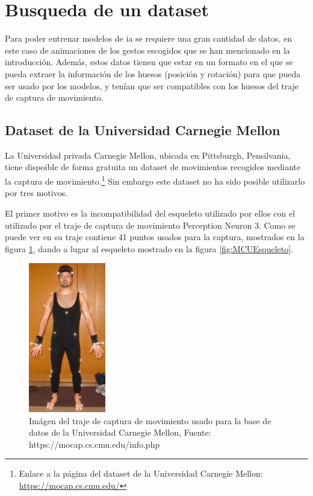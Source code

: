 \section{Busqueda de un dataset}
\label{sec:busquedaDataset}
Para poder entrenar modelos de \gls{ia} se requiere una gran cantidad de datos, en este caso de animaciones de los gestos escogidos que se han mencionado en la introducción.
Además, estos datos tienen que estar en un formato en el que se pueda extraer la información de los huesos (posición y rotación) para que pueda ser usado por los modelos, y tenían que ser compatibles con los huesos del traje de captura de movimiento.

\subsection{Dataset de la Universidad Carnegie Mellon}
La Universidad privada Carnegie Mellon, ubicada en Pittsburgh, Pensilvania, tiene dispoible de forma gratuita un dataset de movimientos recogidos mediante la captura de movimiento.\footnote{Enlace a la página del dataset de la Universidad Carnegie Mellon: \url{https://mocap.cs.cmu.edu/}}
Sin embargo este dataset no ha sido posible utilizarlo por tres motivos.

El primer motivo es la incompatibilidad del esqueleto utilizado por ellos con el utilizado por el traje de captura de movimiento Perception Neuron 3.
Como se puede ver en \cite{MCUINFO} su traje contiene 41 puntos usados para la captura, mostrados en la figura \ref{fig:MCUTraje}, dando a lugar al esqueleto mostrado en la figura \ref{fig:MCUEsqueleto}.

\begin{figure}[H]
    \centering
    \includegraphics[width=0.3\textwidth]{Imagenes/Bitmap/MCUTraje.jpg}
    \caption{Imágen del traje de captura de movimiento usado para la base de datos de la Universidad Carnegie Mellon, Fuente: https://mocap.cs.cmu.edu/info.php}
    \label{fig:MCUTraje}
\end{figure}

